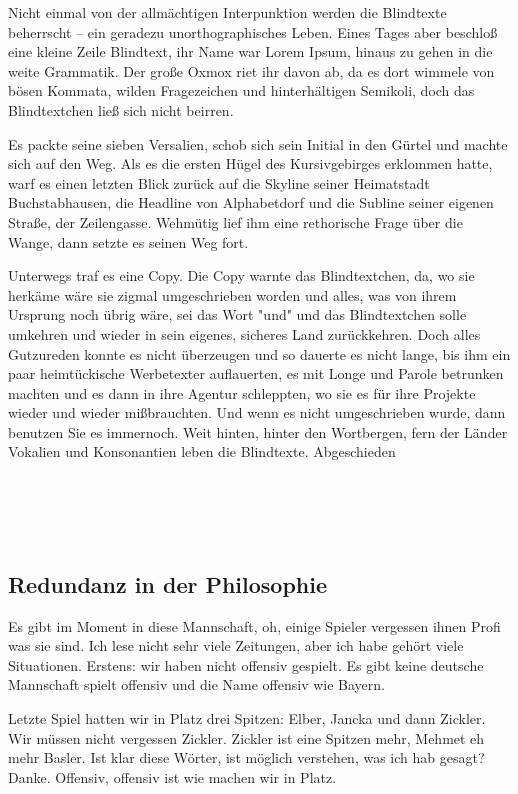 \documentclass[a4paper,11pt]{article}
\begin{document}
Nicht einmal von der allmächtigen Interpunktion werden die
Blindtexte beherrscht – ein geradezu unorthographisches Leben.
Eines Tages aber beschloß eine kleine Zeile Blindtext,
ihr Name war Lorem Ipsum, hinaus zu gehen in die weite Grammatik.
Der große Oxmox riet ihr davon ab, da es dort wimmele von bösen
Kommata, wilden Fragezeichen und hinterhältigen Semikoli, doch
das Blindtextchen ließ sich nicht beirren.

Es packte seine sieben Versalien, schob sich sein Initial in den
Gürtel und machte sich auf den Weg.
Als es die ersten Hügel des Kursivgebirges erklommen hatte,
warf es einen letzten Blick zurück auf die Skyline seiner
Heimatstadt Buchstabhausen, die Headline von Alphabetdorf und
die Subline seiner eigenen Straße, der Zeilengasse.
Wehmütig lief ihm eine rethorische Frage über die Wange, dann
setzte es seinen Weg fort.

Unterwegs traf es eine Copy.
Die Copy warnte das Blindtextchen, da, wo sie herkäme wäre sie
zigmal umgeschrieben worden und alles, was von ihrem Ursprung
noch übrig wäre, sei das Wort "und" und das Blindtextchen solle
umkehren und wieder in sein eigenes, sicheres Land zurückkehren.
Doch alles Gutzureden konnte es nicht überzeugen und so dauerte
es nicht lange, bis ihm ein paar heimtückische Werbetexter
auflauerten, es mit Longe und Parole betrunken machten und
es dann in ihre Agentur schleppten, wo sie es für ihre Projekte
wieder und wieder mißbrauchten.
Und wenn es nicht umgeschrieben wurde, dann benutzen Sie es immernoch.
Weit hinten, hinter den Wortbergen, fern der Länder Vokalien und
Konsonantien leben die Blindtexte.
Abgeschieden\\ 
\\ \\
\\ \\



\subsection{Redundanz in der Philosophie}

Es gibt im Moment in diese Mannschaft, oh, einige Spieler vergessen
ihnen Profi was sie sind.
Ich lese nicht sehr viele Zeitungen, aber ich habe gehört viele Situationen.
Erstens: wir haben nicht offensiv gespielt.
Es gibt keine deutsche Mannschaft spielt offensiv und die Name
offensiv wie Bayern.

Letzte Spiel hatten wir in Platz drei Spitzen: Elber, Jancka und dann Zickler.
Wir müssen nicht vergessen Zickler.
Zickler ist eine Spitzen mehr, Mehmet eh mehr Basler.
Ist klar diese Wörter, ist möglich verstehen, was ich hab gesagt? Danke.
Offensiv, offensiv ist wie machen wir in Platz.
\end{document}
